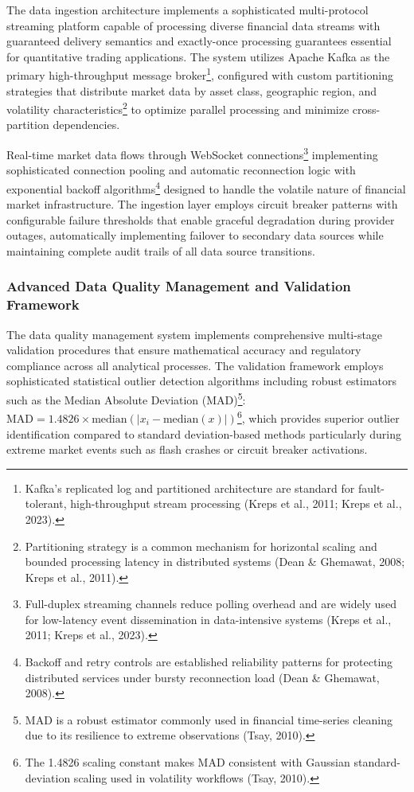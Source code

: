 \documentclass[12pt,a4paper]{article}
\theoremstyle{definition}
\theoremstyle{remark}
\begin{document}
The data ingestion architecture implements a sophisticated multi-protocol streaming platform capable of processing diverse financial data streams with guaranteed delivery semantics and exactly-once processing guarantees essential for quantitative trading applications. The system utilizes Apache Kafka as the primary high-throughput message broker\footnote{Kafka's replicated log and partitioned architecture are standard for fault-tolerant, high-throughput stream processing (Kreps et al., 2011; Kreps et al., 2023).}, configured with custom partitioning strategies that distribute market data by asset class, geographic region, and volatility characteristics\footnote{Partitioning strategy is a common mechanism for horizontal scaling and bounded processing latency in distributed systems (Dean \& Ghemawat, 2008; Kreps et al., 2011).} to optimize parallel processing and minimize cross-partition dependencies.

Real-time market data flows through WebSocket connections\footnote{Full-duplex streaming channels reduce polling overhead and are widely used for low-latency event dissemination in data-intensive systems (Kreps et al., 2011; Kreps et al., 2023).} implementing sophisticated connection pooling and automatic reconnection logic with exponential backoff algorithms\footnote{Backoff and retry controls are established reliability patterns for protecting distributed services under bursty reconnection load (Dean \& Ghemawat, 2008).} designed to handle the volatile nature of financial market infrastructure. The ingestion layer employs circuit breaker patterns with configurable failure thresholds that enable graceful degradation during provider outages, automatically implementing failover to secondary data sources while maintaining complete audit trails of all data source transitions.

\subsubsection{Advanced Data Quality Management and Validation Framework}

The data quality management system implements comprehensive multi-stage validation procedures that ensure mathematical accuracy and regulatory compliance across all analytical processes. The validation framework employs sophisticated statistical outlier detection algorithms including robust estimators such as the Median Absolute Deviation (MAD)\footnote{MAD is a robust estimator commonly used in financial time-series cleaning due to its resilience to extreme observations (Tsay, 2010).}: $\text{MAD} = 1.4826 \times \text{median}(|x_i - \text{median}(x)|)$\footnote{The 1.4826 scaling constant makes MAD consistent with Gaussian standard-deviation scaling used in volatility workflows (Tsay, 2010).}, which provides superior outlier identification compared to standard deviation-based methods particularly during extreme market events such as flash crashes or circuit breaker activations.
\end{document}
